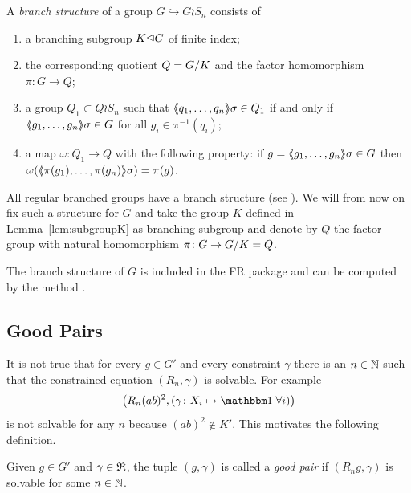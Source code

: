 \documentclass[a4paper,11pt]{amsart}
\begin{document}
\begin{defi} 
A \emph{branch structure} of a group $G\hookrightarrow G \wr S_n$ consists of  
\begin{enumerate}
 \item a branching subgroup $K{\mathrel\trianglelefteq} G$ of finite index;
 \item the corresponding quotient $Q={G/K}$ and the factor homomorphism $\pi\colon G \to Q$;
 \item a group $Q_1 \subset Q \wr S_n$ such that $\langle\negthickspace\langle q_1,\ldots,q_n\rangle\negthickspace\rangle\sigma\in Q_1$ if
  and only if $\langle\negthickspace\langle g_1,\ldots,g_n\rangle\negthickspace\rangle\sigma \in G$ for all $g_i \in \pi^{-1}(q_i)$;
 \item a map $\omega\colon Q_1 \to Q$ with the following property: if 
      $g=\langle\negthickspace\langle g_1,\ldots,g_n\rangle\negthickspace\rangle\sigma \in G$ then $\omega(\langle\negthickspace\langle\pi(g_1),\ldots,\pi(g_n)\rangle\negthickspace\rangle\sigma) = \pi(g)$.
\end{enumerate}
\end{defi}
All regular branched groups have a branch structure
(see {\cite[Remark after Definition~5.1]{Bartholdi:RepresentationZetaFunctions}}).
We will from now on fix such a structure for $G$ and take 
the group $K$ defined in Lemma~\ref{lem:subgroupK} as branching subgroup and 
denote by $Q$ the factor group with natural homomorphism $\pi\colon G \to {G/K}=Q$.

 The branch structure of $G$ is included in the FR package and can be computed by the method
  .

\subsection{Good Pairs}\label{sec:good_pairs}
It is not true that for every $g\in G'$ and every constraint $\gamma$
there is an $n\in\mathbb{N}$ such that the constrained equation
$(R_n,\gamma)$ is solvable. For example
\[\left(R_n(ab)^2,(\gamma\colon X_i\mapsto\id\;\forall i)\right)\] 
is not solvable for any $n$ because $(ab)^2\notin K'$.  This motivates
the following definition.
\begin{defi}
Given $g\in G'$ and $\gamma\in\mathfrak{R}$, the tuple $(g,\gamma)$ is called a \emph{good pair} if 
$(R_ng,\gamma)$ is solvable for some $n\in\mathbb{N}$.  
\end{defi}
\end{document}
